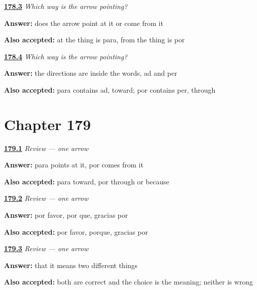 \noindent\begin{minipage}[t]{\linewidth}
\raggedright
\hyperlink{review-ES-C51-la-flecha-test}{\textbf{178.3}} \emph{Which way is the arrow pointing?}\par
\small \textbf{Answer:} does the arrow point at it or come from it\par
\footnotesize \textbf{Also accepted:} at the thing is para, from the thing is por
\end{minipage}\par\medskip

\noindent\begin{minipage}[t]{\linewidth}
\raggedright
\hyperlink{review-ES-C51-la-flecha-why}{\textbf{178.4}} \emph{Which way is the arrow pointing?}\par
\small \textbf{Answer:} the directions are inside the words, ad and per\par
\footnotesize \textbf{Also accepted:} para contains ad, toward; por contains per, through
\end{minipage}\par\medskip

\section*{Chapter 179}

\noindent\begin{minipage}[t]{\linewidth}
\raggedright
\hyperlink{review-ES-C51-repaso-flecha-two}{\textbf{179.1}} \emph{Review — one arrow}\par
\small \textbf{Answer:} para points at it, por comes from it\par
\footnotesize \textbf{Also accepted:} para toward, por through or because
\end{minipage}\par\medskip

\noindent\begin{minipage}[t]{\linewidth}
\raggedright
\hyperlink{review-ES-C51-repaso-flecha-old}{\textbf{179.2}} \emph{Review — one arrow}\par
\small \textbf{Answer:} por favor, por que, gracias por\par
\footnotesize \textbf{Also accepted:} por favor, porque, gracias por
\end{minipage}\par\medskip

\noindent\begin{minipage}[t]{\linewidth}
\raggedright
\hyperlink{review-ES-C51-repaso-flecha-both}{\textbf{179.3}} \emph{Review — one arrow}\par
\small \textbf{Answer:} that it means two different things\par
\footnotesize \textbf{Also accepted:} both are correct and the choice is the meaning; neither is wrong
\end{minipage}\par\medskip

